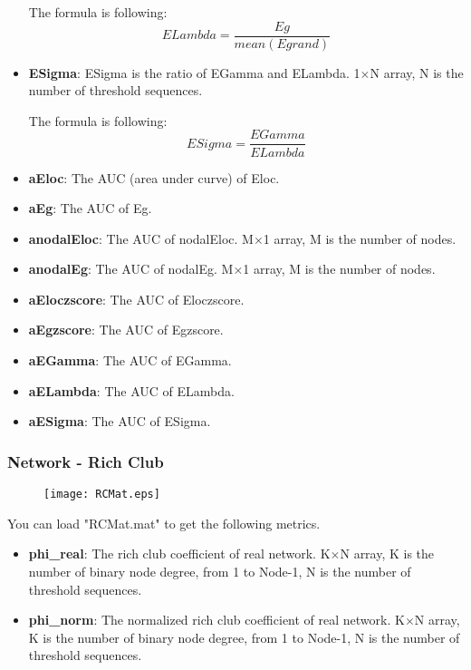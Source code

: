 \documentclass[11pt]{article}
\begin{document}
\begin{itemize}
						The formula is following:
						$$ELambda=\frac{Eg}{mean(Egrand)}$$
					\item \textbf{ESigma}: ESigma is the ratio of EGamma and ELambda.
						1$\times$N array, N is the number of threshold sequences.
						
						The formula is following:
						$$ESigma=\frac{EGamma}{ELambda}$$
					\item \textbf{aEloc}: The AUC (area under curve) of Eloc.
					\item \textbf{aEg}: The AUC of Eg.
					\item \textbf{anodalEloc}: The AUC of nodalEloc.
						M$\times$1 array, M is the number of nodes.
					\item \textbf{anodalEg}: The AUC of nodalEg.
						M$\times$1 array, M is the number of nodes.
					\item \textbf{aEloczscore}: The AUC of Eloczscore.
					\item \textbf{aEgzscore}: The AUC of Egzscore.
					\item \textbf{aEGamma}: The AUC of EGamma.
					\item \textbf{aELambda}: The AUC of ELambda.
					\item \textbf{aESigma}: The AUC of ESigma.
				\end{itemize}
			\subsubsection{Network - Rich Club}
				\begin{figure}
					\begin{center}
						\texttt{[image: RCMat.eps]}
					\end{center}
				\end{figure}
				You can load "RCMat.mat" to get the following metrics.
				\begin{itemize}
					\item \textbf{phi\_real}: The rich club coefficient of real network.
						K$\times$N array, K is the number of binary node degree,
                        from 1 to Node-1,
                        N is the number of threshold sequences.
					\item \textbf{phi\_norm}: The normalized rich club coefficient of 
                        real network.
						K$\times$N array, K is the number of binary node degree, 
                        from 1 to Node-1, 
                        N is the number of threshold sequences.
				\end{itemize}
\end{document}
